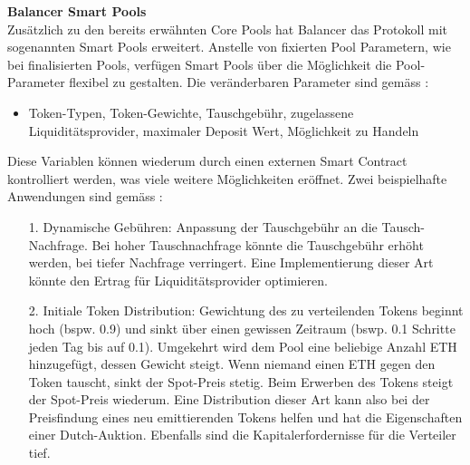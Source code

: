 \documentclass[12pt,a4paper,titlepage,oneside,english]{article}
\begin{document}
\textbf{Balancer Smart Pools}\\
Zusätzlich zu den bereits erwähnten Core Pools hat Balancer das Protokoll mit sogenannten Smart Pools erweitert. %
Anstelle von fixierten Pool Parametern, wie bei finalisierten Pools, verfügen Smart Pools über die Möglichkeit die Pool-Parameter flexibel zu gestalten.
Die veränderbaren Parameter sind gemäss \citet{Hoffman2020}:
\begin{itemize}
  \item{Token-Typen, Token-Gewichte, Tauschgebühr, zugelassene Liquiditätsprovider, maximaler Deposit Wert, Möglichkeit zu Handeln} %
\end{itemize}
Diese Variablen können wiederum durch einen externen Smart Contract kontrolliert werden, was viele weitere Möglichkeiten eröffnet. Zwei beispielhafte Anwendungen sind gemäss \citep{Hoffman2020}:
\begin{itemize}
  \item[1.]{Dynamische Gebühren: Anpassung der Tauschgebühr an die Tausch-Nachfrage. Bei hoher Tauschnachfrage könnte die Tauschgebühr erhöht werden, bei tiefer Nachfrage verringert. Eine Implementierung dieser Art könnte den Ertrag für Liquiditätsprovider optimieren.}
  \item[2.]{Initiale Token Distribution: Gewichtung des zu verteilenden Tokens beginnt hoch (bspw. 0.9) und sinkt über einen gewissen Zeitraum (bswp. 0.1 Schritte jeden Tag bis auf 0.1). Umgekehrt wird dem Pool eine beliebige Anzahl ETH hinzugefügt, dessen Gewicht steigt. Wenn niemand einen ETH gegen den Token tauscht, sinkt der Spot-Preis stetig. Beim Erwerben des Tokens steigt der Spot-Preis wiederum. Eine Distribution dieser Art kann also bei der Preisfindung eines neu emittierenden Tokens helfen und hat die Eigenschaften einer Dutch-Auktion. Ebenfalls sind die Kapitalerfordernisse für die Verteiler tief.}
  \end{itemize}
\end{document}

